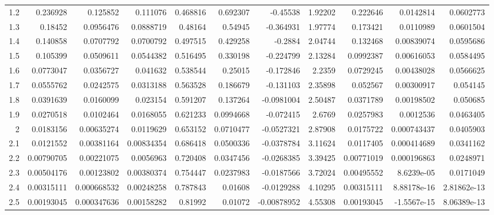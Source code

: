 {\begin{tabular}{rrrrrrrrrrr}
  1.2         & 0.236928   & 0.125852    &   0.111076    &     0.468816  & 0.692307   &   -0.45538    &      1.92202  & 0.222646   &   0.0142814   &   0.0602773   \\
  1.3         & 0.18452    & 0.0956476   &   0.0888719   &     0.48164   & 0.54945    &   -0.364931   &      1.97774  & 0.173421   &   0.0110989   &   0.0601504   \\
  1.4         & 0.140858   & 0.0707792   &   0.0700792   &     0.497515  & 0.429258   &   -0.2884     &      2.04744  & 0.132468   &   0.00839074  &   0.0595686   \\
  1.5         & 0.105399   & 0.0509611   &   0.0544382   &     0.516495  & 0.330198   &   -0.224799   &      2.13284  & 0.0992387  &   0.00616053  &   0.0584495   \\
  1.6         & 0.0773047  & 0.0356727   &   0.041632    &     0.538544  & 0.25015    &   -0.172846   &      2.2359   & 0.0729245  &   0.00438028  &   0.0566625   \\
  1.7         & 0.0555762  & 0.0242575   &   0.0313188   &     0.563528  & 0.186679   &   -0.131103   &      2.35898  & 0.052567   &   0.00300917  &   0.054145    \\
  1.8         & 0.0391639  & 0.0160099   &   0.023154    &     0.591207  & 0.137264   &   -0.0981004  &      2.50487  & 0.0371789  &   0.00198502  &   0.050685    \\
  1.9         & 0.0270518  & 0.0102464   &   0.0168055   &     0.621233  & 0.0994668  &   -0.072415   &      2.6769   & 0.0257983  &   0.0012536   &   0.0463405   \\
  2           & 0.0183156  & 0.00635274  &   0.0119629   &     0.653152  & 0.0710477  &   -0.0527321  &      2.87908  & 0.0175722  &   0.000743437 &   0.0405903   \\
  2.1         & 0.0121552  & 0.00381164  &   0.00834354  &     0.686418  & 0.0500336  &   -0.0378784  &      3.11624  & 0.0117405  &   0.000414689 &   0.0341162   \\
  2.2         & 0.00790705 & 0.00221075  &   0.0056963   &     0.720408  & 0.0347456  &   -0.0268385  &      3.39425  & 0.00771019 &   0.000196863 &   0.0248971   \\
  2.3         & 0.00504176 & 0.00123802  &   0.00380374  &     0.754447  & 0.0237983  &   -0.0187566  &      3.72024  & 0.00495552 &   8.6239e-05  &   0.0171049   \\
  2.4         & 0.00315111 & 0.000668532 &   0.00248258  &     0.787843  & 0.01608    &   -0.0129288  &      4.10295  & 0.00315111 &   8.88178e-16 &   2.81862e-13 \\
  2.5         & 0.00193045 & 0.000347636 &   0.00158282  &     0.81992   & 0.01072    &   -0.00878952 &      4.55308  & 0.00193045 &  -1.5567e-15  &   8.06389e-13 \\
\hline
\end{tabular}
}
